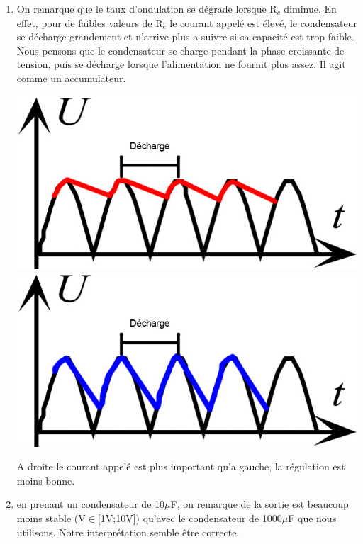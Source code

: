 \documentclass[12pt,a4paper]{article}
\begin{document}
\begin{enumerate}
\item On remarque que le taux d'ondulation se dégrade lorsque R$_{c}$ diminue. En effet, pour de faibles valeurs de R$_{c}$ le courant appelé est élevé, le condensateur se décharge grandement et n'arrive plus a suivre si sa capacité est trop faible. Nous pensons que le condensateur se charge pendant la phase croissante de tension, puis se décharge lorsque l'alimentation ne fournit plus assez. Il agit comme un accumulateur.
\begin{multicols}{2}
\includegraphics[scale=0.25]{Condensateur}
\columnbreak
\includegraphics[scale=0.25]{Condensateur2}
\end{multicols}
A droite le courant appelé est plus important qu'a gauche, la régulation est moins bonne.
\item en prenant un condensateur de 10$\mu$F, on remarque de la sortie est beaucoup moins stable (V$\in$[1V;10V]) qu'avec le condensateur de 1000$\mu$F que nous utilisons. Notre interprétation semble être correcte.
\end{enumerate}
\end{document}
